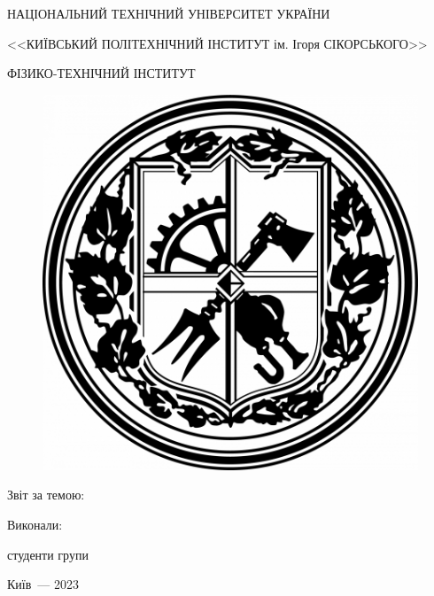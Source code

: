 \thispagestyle{empty}

\begin{center}
НАЦІОНАЛЬНИЙ ТЕХНІЧНИЙ УНІВЕРСИТЕТ УКРАЇНИ \par
<<КИЇВСЬКИЙ ПОЛІТЕХНІЧНИЙ ІНСТИТУТ ім. Ігоря СІКОРСЬКОГО>>\par
ФІЗИКО-ТЕХНІЧНИЙ ІНСТИТУТ\par

\vspace{7mm}
\begin{figure}[!h]
    \centering
    \includegraphics[scale = 0.25]{IMAGES/logoKPI.png}
    \label{logoKPI}
\end{figure}

\vspace{7mm}
{\huge Звіт за темою: \par}
\vspace{1mm}
\LARGE\MakeUppercase{\textbf{\reportTitle}} \par
\end{center}

\vspace{40mm}
\begin{flushright}
Виконали: 

студенти групи \reportAuthorGroup

\reportAuthor

\vspace{20mm}



\end{flushright}

\vspace{10mm}
\begin{center}
{Київ~--- 2023}
\end{center}

\newpage
